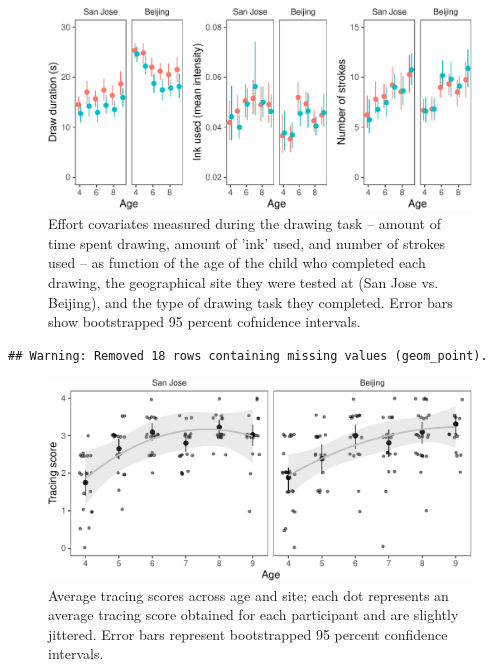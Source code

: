\documentclass[
  english,
  man]{apa6}
\begin{document}
\begin{figure}[H]

{\centering \includegraphics[width=\textwidth]{Manuscript_June2021_files/figure-latex/effort-covariates-1} 

}

\caption{Effort covariates measured during the drawing task -- amount of time spent drawing, amount of 'ink' used, and number of strokes used -- as function of the age of the child who completed each drawing, the geographical site they were tested at (San Jose vs. Beijing), and the type of drawing task they completed. Error bars show bootstrapped 95 percent cofnidence intervals.}\label{fig:effort-covariates}
\end{figure}

\begin{verbatim}
## Warning: Removed 18 rows containing missing values (geom_point).
\end{verbatim}

\begin{figure}[H]

{\centering \includegraphics[width=\textwidth]{Manuscript_June2021_files/figure-latex/tracing-1} 

}

\caption{Average tracing scores across age and site; each dot represents an average tracing score obtained for each participant and are slightly jittered. Error bars represent bootstrapped 95 percent confidence intervals.}\label{fig:tracing}
\end{figure}
\end{document}
